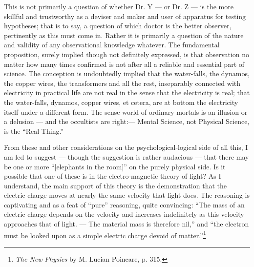 \documentclass[a4paper, 11pt, oneside, polutonikogreek, english]{article}
\begin{document}
This is not primarily a question of whether Dr. Y --- or Dr. Z --- is the more skillful and trustworthy as a deviser and maker and user of apparatus for testing hypotheses; that is to say, a question of which doctor is the better observer, pertinently as this must come in. Rather it is primarily a question of the nature and validity of any observational knowledge whatever. The fundamental proposition, surely implied though not definitely expressed, is that observation no matter how many times confirmed is not after all a reliable and essential part of science. The conception is undoubtedly implied that the water-falls, the dynamos, the copper wires, the transformers and all the rest, inseparably connected with electricity in practical life are not real in the sense that the electricity is real; that the water-falls, dynamos, copper wires, et cetera, are at bottom the electricity itself under a different form. The sense world of ordinary mortals is an illusion or a delusion --- and the occultists are right:--- Mental Science, not Physical Science, is the ``Real Thing.''

From these and other considerations on the psychological-logical side of all this, I am led to suggest --- though the suggestion is rather audacious --- that there may be one or more ``[elephants in the room]'' on the purely physical side. Is it possible that one of these is in the electro-magnetic theory of light? As I understand, the main support of this theory is the demonstration that the electric charge moves at nearly the same velocity that light does. The reasoning is captivating and as a feat of ``pure'' reasoning, quite convincing: ``The mass of an electric charge depends on the velocity and increases indefinitely as this velocity approaches that of light. --- The material mass is therefore nil,'' and ``the electron must be looked upon as a simple electric charge devoid of matter.''\footnote{\emph{The New Physics} by M. Lucian Poincare, p. 315.}
\end{document}

